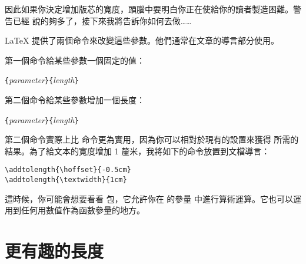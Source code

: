 因此如果你決定增加版芯的寬度，頭腦中要明白你正在使給你的讀者製造困難。警告已經
說的夠多了，接下來我將告訴你如何去做……

\LaTeX{} 提供了兩個命令來改變這些參數。他們通常在文章的導言部分使用。

第一個命令給某些參數一個固定的值：
\begin{lscommand}
\verb|{|\emph{parameter}\verb|}{|\emph{length}\verb|}|
\end{lscommand}


第二個命令給某些參數增加一個長度：
\begin{lscommand}
\verb|{|\emph{parameter}\verb|}{|\emph{length}\verb|}|
\end{lscommand}

第二個命令實際上比  命令更為實用，因為你可以相對於現有的設置來獲得
所需的結果。為了給文本的寬度增加 1 釐米，我將如下的命令放置到文檔導言：
\begin{code}
\verb|\addtolength{\hoffset}{-0.5cm}|\\
\verb|\addtolength{\textwidth}{1cm}|
\end{code}

這時候，你可能會想要看看  包，它允許你在  的參量
中進行算術運算。它也可以運用到任何用數值作為函數參量的地方。


\section{更有趣的長度}

